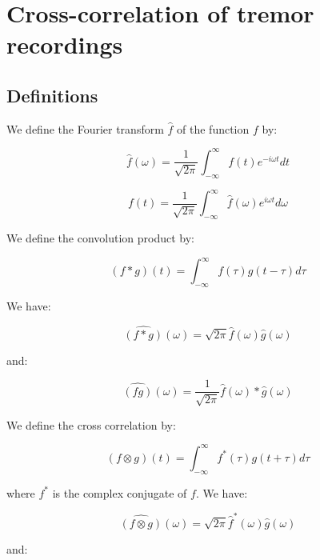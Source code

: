 \documentclass[methods.tex]{subfiles}
\begin{document}
\section{Cross-correlation of tremor recordings}

\subsection{Definitions}

We define the Fourier transform $\hat{f}$ of the function $f$ by:

\begin{equation}
\hat{f} (\omega) = \frac{1}{\sqrt{2 \pi}} \int_{- \infty}^{\infty} f(t) e^{-i \omega t} dt
\end{equation}

\begin{equation}
f(t) = \frac{1}{\sqrt{2 \pi}} \int_{- \infty}^{\infty} \hat{f} (\omega) e^{i \omega t} d\omega
\end{equation}

We define the convolution product by:

\begin{equation}
(f * g) (t) = \int_{-\infty}^{\infty} f(\tau) g(t - \tau) d\tau
\end{equation}

We have:

\begin{equation}
\hat{(f * g)} (\omega) = \sqrt{2 \pi} \hat{f} (\omega) \hat{g} (\omega)
\end{equation}

and:

\begin{equation}
\hat{(f g)} (\omega) = \frac{1}{\sqrt{2 \pi}} \hat{f} (\omega) * \hat{g} (\omega)
\end{equation}

We define the cross correlation by:

\begin{equation}
(f \otimes g) (t) = \int_{- \infty}^{\infty} f^* (\tau) g(t + \tau) d\tau
\end{equation}

where $f^*$ is the complex conjugate of $f$. We have:

\begin{equation}
\hat{(f \otimes g)} (\omega) = \sqrt{2 \pi} \hat{f}^* (\omega) \hat{g} (\omega)
\end{equation}
 
 and:
\end{document}
